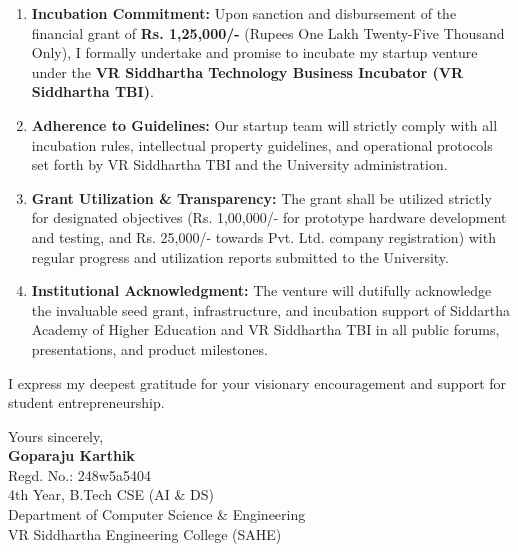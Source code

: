 \documentclass[11pt,a4paper]{article}
\begin{document}
\begin{enumerate}
    \setlength{\itemsep}{0.25em}
    \item \textbf{Incubation Commitment:} Upon sanction and disbursement of the financial grant of \textbf{Rs. 1,25,000/-} (Rupees One Lakh Twenty-Five Thousand Only), I formally undertake and promise to incubate my startup venture under the \textbf{VR Siddhartha Technology Business Incubator (VR Siddhartha TBI)}.
    \item \textbf{Adherence to Guidelines:} Our startup team will strictly comply with all incubation rules, intellectual property guidelines, and operational protocols set forth by VR Siddhartha TBI and the University administration.
    \item \textbf{Grant Utilization \& Transparency:} The grant shall be utilized strictly for designated objectives (Rs. 1,00,000/- for prototype hardware development and testing, and Rs. 25,000/- towards Pvt. Ltd. company registration) with regular progress and utilization reports submitted to the University.
    \item \textbf{Institutional Acknowledgment:} The venture will dutifully acknowledge the invaluable seed grant, infrastructure, and incubation support of Siddartha Academy of Higher Education and VR Siddhartha TBI in all public forums, presentations, and product milestones.
\end{enumerate}

\noindent I express my deepest gratitude for your visionary encouragement and support for student entrepreneurship.

\vspace{1.5em}

\begin{flushleft}
    Yours sincerely,\\[2.2em]
    \textbf{Goparaju Karthik} \\
    Regd. No.: 248w5a5404 \\
    4th Year, B.Tech CSE (AI \& DS) \\
    Department of Computer Science \& Engineering \\
    VR Siddhartha Engineering College (SAHE)
\end{flushleft}
\end{document}
